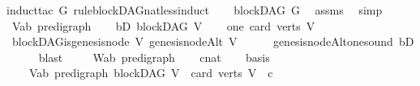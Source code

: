\begin{isabellebody}
\isatagproof
{}\isamarkupfalse%
{\isacharparenleft}{\kern0pt}induct{\isacharunderscore}{\kern0pt}tac\ G\ rule{\isacharcolon}{\kern0pt}blockDAG{\isacharunderscore}{\kern0pt}nat{\isacharunderscore}{\kern0pt}less{\isacharunderscore}{\kern0pt}induct{\isacharparenright}{\kern0pt}\isanewline
\ \ \isamarkupfalse%
\ {\isachardoublequoteopen}blockDAG\ G{\isachardoublequoteclose}\ \isamarkupfalse%
\ assms\ \isamarkupfalse%
\ simp\isanewline
{}\isamarkupfalse%
\ \isanewline
\ \ \isamarkupfalse%
\ V{\isacharcolon}{\kern0pt}{\isacharcolon}{\kern0pt}{\isachardoublequoteopen}{\isacharparenleft}{\kern0pt}{\isacharprime}{\kern0pt}a{\isacharcomma}{\kern0pt}{\isacharprime}{\kern0pt}b{\isacharparenright}{\kern0pt}\ pre{\isacharunderscore}{\kern0pt}digraph{\isachardoublequoteclose}\isanewline
\ \ \isamarkupfalse%
\ bD{\isacharcolon}{\kern0pt}\ {\isachardoublequoteopen}blockDAG\ V{\isachardoublequoteclose}\isanewline
\ \ \isamarkupfalse%
\ one{\isacharcolon}{\kern0pt}\ {\isachardoublequoteopen}card\ {\isacharparenleft}{\kern0pt}verts\ V{\isacharparenright}{\kern0pt}\ {\isacharequal}{\kern0pt}\ {}{\isachardoublequoteclose}\isanewline
\ \ \isamarkupfalse%
\ \isamarkupfalse%
\ {\isachardoublequoteopen}blockDAG{\isachardot}{\kern0pt}is{\isacharunderscore}{\kern0pt}genesis{\isacharunderscore}{\kern0pt}node\ V\ {\isacharparenleft}{\kern0pt}genesis{\isacharunderscore}{\kern0pt}nodeAlt\ V{\isacharparenright}{\kern0pt}{\isachardoublequoteclose}\isanewline
\ \ \ \ \isamarkupfalse%
\ genesis{\isacharunderscore}{\kern0pt}nodeAlt{\isacharunderscore}{\kern0pt}one{\isacharunderscore}{\kern0pt}sound\ bD\isanewline
\ \ \ \ \isamarkupfalse%
\ blast\ \isanewline
{}\isamarkupfalse%
\isanewline
\ \ \isamarkupfalse%
\ W{\isacharcolon}{\kern0pt}{\isacharcolon}{\kern0pt}{\isachardoublequoteopen}{\isacharparenleft}{\kern0pt}{\isacharprime}{\kern0pt}a{\isacharcomma}{\kern0pt}{\isacharprime}{\kern0pt}b{\isacharparenright}{\kern0pt}\ pre{\isacharunderscore}{\kern0pt}digraph{\isachardoublequoteclose}\isanewline
\ \ \isamarkupfalse%
\ c{\isacharcolon}{\kern0pt}{\isacharcolon}{\kern0pt}nat\isanewline
\ \ \isamarkupfalse%
\ basis{\isacharcolon}{\kern0pt}\ \isanewline
\ \ \ \ {\isachardoublequoteopen}{\isacharparenleft}{\kern0pt}{\isasymAnd}V{\isacharcolon}{\kern0pt}{\isacharcolon}{\kern0pt}{\isacharparenleft}{\kern0pt}{\isacharprime}{\kern0pt}a{\isacharcomma}{\kern0pt}{\isacharprime}{\kern0pt}b{\isacharparenright}{\kern0pt}\ pre{\isacharunderscore}{\kern0pt}digraph{\isachardot}{\kern0pt}\ blockDAG\ V\ {\isasymLongrightarrow}\ card\ {\isacharparenleft}{\kern0pt}verts\ V{\isacharparenright}{\kern0pt}\ {\isacharless}{\kern0pt}\ c\ {\isasymLongrightarrow}\ \isanewline

\end{isabellebody}
